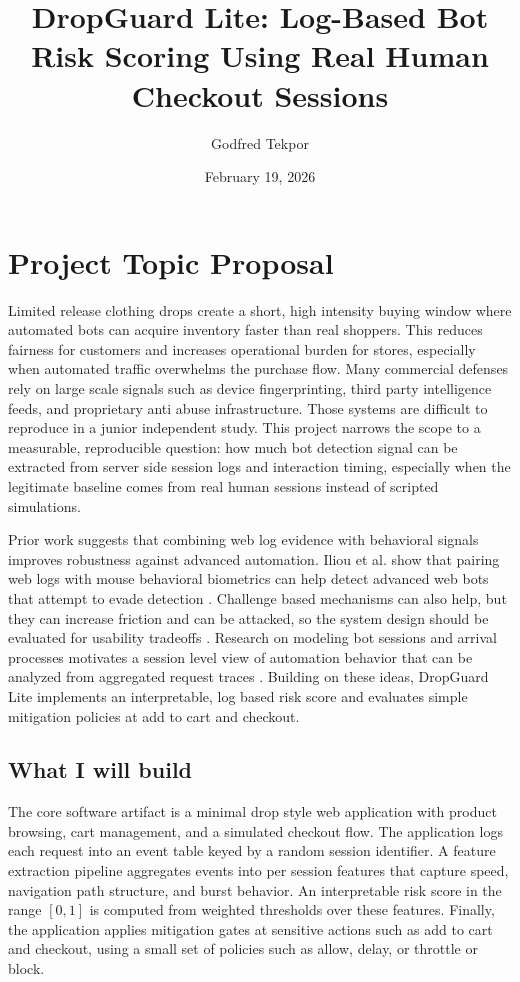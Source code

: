 \documentclass[12pt]{article}
\begin{document}
\title{DropGuard Lite: Log-Based Bot Risk Scoring Using Real Human Checkout Sessions}
\author{Godfred Tekpor}
\date{February 19, 2026}

\maketitle

\section{Project Topic Proposal}

Limited release clothing drops create a short, high intensity buying window where automated bots can acquire inventory faster than real shoppers. This reduces fairness for customers and increases operational burden for stores, especially when automated traffic overwhelms the purchase flow. Many commercial defenses rely on large scale signals such as device fingerprinting, third party intelligence feeds, and proprietary anti abuse infrastructure. Those systems are difficult to reproduce in a junior independent study. This project narrows the scope to a measurable, reproducible question: how much bot detection signal can be extracted from server side session logs and interaction timing, especially when the legitimate baseline comes from real human sessions instead of scripted simulations.

Prior work suggests that combining web log evidence with behavioral signals improves robustness against advanced automation. Iliou et al. show that pairing web logs with mouse behavioral biometrics can help detect advanced web bots that attempt to evade detection \cite{10.1145/3447815}. Challenge based mechanisms can also help, but they can increase friction and can be attacked, so the system design should be evaluated for usability tradeoffs \cite{10.1145/3672608.3707741}. Research on modeling bot sessions and arrival processes motivates a session level view of automation behavior that can be analyzed from aggregated request traces \cite{10.1145/3538969.3538994}. Building on these ideas, DropGuard Lite implements an interpretable, log based risk score and evaluates simple mitigation policies at add to cart and checkout.

\subsection*{What I will build}

The core software artifact is a minimal drop style web application with product browsing, cart management, and a simulated checkout flow. The application logs each request into an event table keyed by a random session identifier. A feature extraction pipeline aggregates events into per session features that capture speed, navigation path structure, and burst behavior. An interpretable risk score in the range $[0,1]$ is computed from weighted thresholds over these features. Finally, the application applies mitigation gates at sensitive actions such as add to cart and checkout, using a small set of policies such as allow, delay, or throttle or block.
\end{document}
